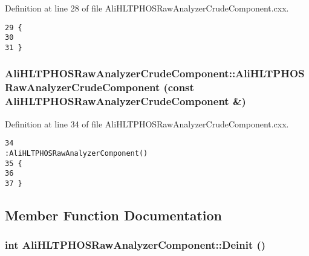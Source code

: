 Definition at line 28 of file Ali\-HLTPHOSRaw\-Analyzer\-Crude\-Component.cxx.

\footnotesize\begin{verbatim}29 {
30 
31 }
\end{verbatim}\normalsize 


\subsubsection{\setlength{\rightskip}{0pt plus 5cm}Ali\-HLTPHOSRaw\-Analyzer\-Crude\-Component::Ali\-HLTPHOSRaw\-Analyzer\-Crude\-Component (const {\bf Ali\-HLTPHOSRaw\-Analyzer\-Crude\-Component} \&)}\label{classAliHLTPHOSRawAnalyzerCrudeComponent_AliHLTPHOSRawAnalyzerCrudeComponenta2}




Definition at line 34 of file Ali\-HLTPHOSRaw\-Analyzer\-Crude\-Component.cxx.

\footnotesize\begin{verbatim}34                                                                                                                     :AliHLTPHOSRawAnalyzerComponent()
35 {
36 
37 }
\end{verbatim}\normalsize 




\subsection{Member Function Documentation}
\subsubsection{\setlength{\rightskip}{0pt plus 5cm}int Ali\-HLTPHOSRaw\-Analyzer\-Component::Deinit ()\hspace{0.3cm}{\tt  [virtual, inherited]}}\label{classAliHLTPHOSRawAnalyzerComponent_AliHLTPHOSRawAnalyzerPeakFinderComponenta7}




